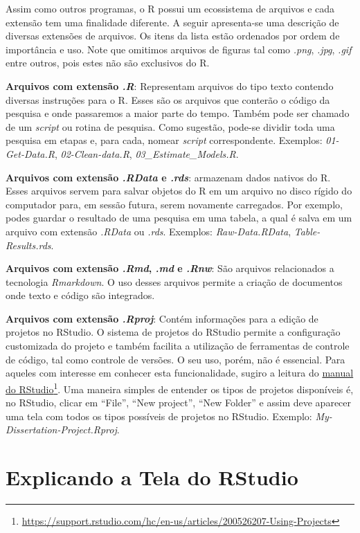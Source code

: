 \documentclass[
  11pt,
]{book}
\begin{document}
Assim como outros programas, o R possui um ecossistema de arquivos e cada extensão tem uma finalidade diferente. A seguir apresenta-se uma descrição de diversas extensões de arquivos. Os itens da lista estão ordenados por ordem de importância e uso. Note que omitimos arquivos de figuras tal como \emph{.png}, \emph{.jpg}, \emph{.gif} entre outros, pois estes não são exclusivos do R.

\textbf{Arquivos com extensão \emph{.R}}: Representam arquivos do tipo texto contendo diversas instruções para o R. Esses são os arquivos que conterão o código da pesquisa e onde passaremos a maior parte do tempo. Também pode ser chamado de um \emph{script} ou rotina de pesquisa. Como sugestão, pode-se dividir toda uma pesquisa em etapas e, para cada, nomear \emph{script} correspondente. Exemplos: \emph{01-Get-Data.R}, \emph{02-Clean-data.R}, \emph{03\_Estimate\_Models.R}.

\textbf{Arquivos com extensão \emph{.RData} e \emph{.rds}}: armazenam dados nativos do R. Esses arquivos servem para salvar objetos do R em um arquivo no disco rígido do computador para, em sessão futura, serem novamente carregados. Por exemplo, podes guardar o resultado de uma pesquisa em uma tabela, a qual é salva em um arquivo com extensão \emph{.RData} ou \emph{.rds}. Exemplos: \emph{Raw-Data.RData}, \emph{Table-Results.rds}.

\textbf{Arquivos com extensão \emph{.Rmd}, \emph{.md} e \emph{.Rnw}}: São arquivos relacionados a tecnologia \emph{Rmarkdown}. O uso desses arquivos permite a criação de documentos onde texto e código são integrados.

\textbf{Arquivos com extensão \emph{.Rproj}}: Contém informações para a edição de projetos no RStudio. O sistema de projetos do RStudio permite a configuração customizada do projeto e também facilita a utilização de ferramentas de controle de código, tal como controle de versões. O seu uso, porém, não é essencial. Para aqueles com interesse em conhecer esta funcionalidade, sugiro a leitura do \href{https://support.rstudio.com/hc/en-us/articles/200526207-Using-Projects}{manual do RStudio}\footnote{\url{https://support.rstudio.com/hc/en-us/articles/200526207-Using-Projects}}. Uma maneira simples de entender os tipos de projetos disponíveis é, no RStudio, clicar em ``File'', ``New project'', ``New Folder'' e assim deve aparecer uma tela com todos os tipos possíveis de projetos no RStudio. Exemplo: \emph{My-Dissertation-Project.Rproj}.

\hypertarget{explicando-a-tela-do-rstudio}{%
\section{Explicando a Tela do RStudio}\label{explicando-a-tela-do-rstudio}}
\end{document}
